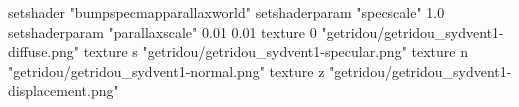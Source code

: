 setshader "bumpspecmapparallaxworld"
setshaderparam "specscale" 1.0
setshaderparam "parallaxscale" 0.01 0.01
texture 0 "getridou/getridou_sydvent1-diffuse.png"
texture s "getridou/getridou_sydvent1-specular.png"
texture n "getridou/getridou_sydvent1-normal.png"
texture z "getridou/getridou_sydvent1-displacement.png"
